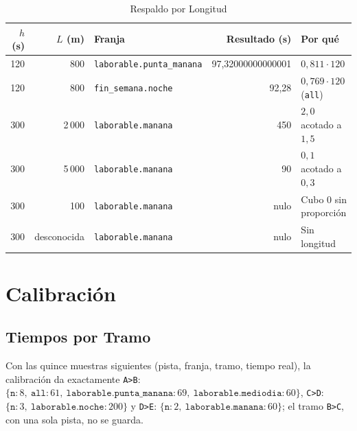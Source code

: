 \begin{table}[ht]
\centering
\caption{Respaldo por Longitud}\label{tab:v-respaldo}
\begin{tabular}{@{}rrlr>{\raggedright\arraybackslash}p{}@{}}
\toprule
$h$ (s) & $L$ (m) & Franja & Resultado (s) & Por qué\\
\midrule
120 & 800 & \texttt{laborable.punta\_manana} & 97,32000000000001 & $0{,}811\cdot120$\\
120 & 800 & \texttt{fin\_semana.noche} & 92,28 & $0{,}769\cdot120$ (\texttt{all})\\
300 & 2\,000 & \texttt{laborable.manana} & 450 & $2{,}0$ acotado a $1{,}5$\\
300 & 5\,000 & \texttt{laborable.manana} & 90 & $0{,}1$ acotado a $0{,}3$\\
300 & 100 & \texttt{laborable.manana} & nulo & Cubo 0 sin proporción\\
300 & desconocida & \texttt{laborable.manana} & nulo & Sin longitud\\
\bottomrule
\end{tabular}
\end{table}

\section{Calibración}

\subsection{Tiempos por Tramo} Con las quince muestras siguientes (pista, franja, tramo, tiempo real), la calibración
da exactamente
\texttt{A>B}: $\{\texttt{n}:8,\ \texttt{all}:61,\ \texttt{laborable.punta\_manana}:69,\ \texttt{laborable.mediodia}:60\}$,
\texttt{C>D}: $\{\texttt{n}:3,\ \texttt{laborable.noche}:200\}$ y
\texttt{D>E}: $\{\texttt{n}:2,\ \texttt{laborable.manana}:60\}$; el tramo \texttt{B>C}, con una sola pista, no se
guarda.


